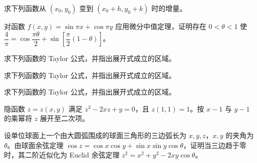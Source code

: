 \noindent\begin{minipage}{\textwidth}
求下列函数从 $(x_0,y_0)$ 变到 $(x_0+h,y_0+k)$ 时的增量。
\end{minipage}\par\vfill
\noindent\begin{minipage}{\textwidth}
对函数 $f(x,y)=\sin\pi x+\cos\pi y$ 应用微分中值定理，证明存在 $0<\theta<1$ 使 $\dfrac4\pi=\cos\dfrac{\pi\theta}{2}+\sin\!\left[\dfrac\pi2(1-\theta)\right]$。
\end{minipage}\par\vfill
\newpage
\noindent\begin{minipage}{\textwidth}
求下列函数的 Taylor 公式，并指出展开式成立的区域。
\end{minipage}\par\vfill
\noindent\begin{minipage}{\textwidth}
求下列函数的 Taylor 公式，并指出展开式成立的区域。
\end{minipage}\par\vfill
\noindent\begin{minipage}{\textwidth}
求下列函数的 Taylor 公式，并指出展开式成立的区域。
\end{minipage}\par\vfill
\noindent\begin{minipage}{\textwidth}
隐函数 $z=z(x,y)$ 满足 $z^3-2xz+y=0$，且 $z(1,1)=1$。按 $x-1$ 与 $y-1$ 的乘幂将 $z$ 展开至二次项。
\end{minipage}\par\vfill
\newpage
\noindent\begin{minipage}{\textwidth}
设单位球面上一个由大圆弧围成的球面三角形的三边弧长为 $x,y,z$，$x,y$ 的夹角为 $\theta$。由球面余弦定理 $\cos z=\cos x\cos y+\sin x\sin y\cos\theta$，证明当三边趋于零时，其二阶近似化为 Euclid 余弦定理 $z^2=x^2+y^2-2xy\cos\theta$。
\end{minipage}\par\vfill
